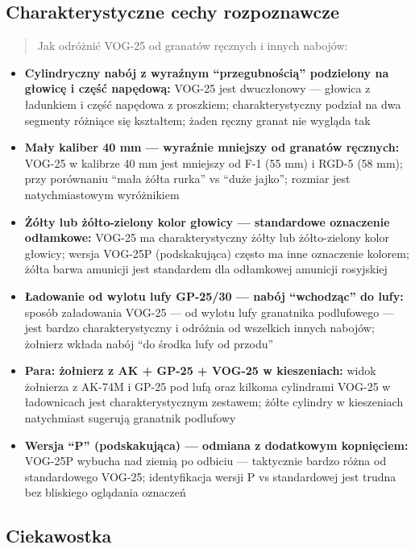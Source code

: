 \documentclass[12pt,oneside]{book}
\providecommand{\tightlist}{%
  \setlength{\itemsep}{0pt}\setlength{\parskip}{0pt}}
\begin{document}
\subsection{Charakterystyczne cechy
rozpoznawcze}\label{charakterystyczne-cechy-rozpoznawcze-121}

\begin{quote}
Jak odróżnić VOG-25 od granatów ręcznych i innych nabojów:
\end{quote}

\begin{itemize}
\tightlist
\item
  \textbf{Cylindryczny nabój z wyraźnym ``przegubnością'' podzielony na
  głowicę i część napędową:} VOG-25 jest dwuczłonowy --- głowica z
  ładunkiem i część napędowa z proszkiem; charakterystyczny podział na
  dwa segmenty różniące się kształtem; żaden ręczny granat nie wygląda
  tak
\item
  \textbf{Mały kaliber 40 mm --- wyraźnie mniejszy od granatów
  ręcznych:} VOG-25 w kalibrze 40 mm jest mniejszy od F-1 (55 mm) i
  RGD-5 (58 mm); przy porównaniu ``mała żółta rurka'' vs ``duże jajko'';
  rozmiar jest natychmiastowym wyróżnikiem
\item
  \textbf{Żółty lub żółto-zielony kolor głowicy --- standardowe
  oznaczenie odłamkowe:} VOG-25 ma charakterystyczny żółty lub
  żółto-zielony kolor głowicy; wersja VOG-25P (podskakująca) często ma
  inne oznaczenie kolorem; żółta barwa amunicji jest standardem dla
  odłamkowej amunicji rosyjskiej
\item
  \textbf{Ładowanie od wylotu lufy GP-25/30 --- nabój ``wchodząc'' do
  lufy:} sposób załadowania VOG-25 --- od wylotu lufy granatnika
  podlufowego --- jest bardzo charakterystyczny i odróżnia od wszelkich
  innych nabojów; żołnierz wkłada nabój ``do środka lufy od przodu''
\item
  \textbf{Para: żołnierz z AK + GP-25 + VOG-25 w kieszeniach:} widok
  żołnierza z AK-74M i GP-25 pod lufą oraz kilkoma cylindrami VOG-25 w
  ładownicach jest charakterystycznym zestawem; żółte cylindry w
  kieszeniach natychmiast sugerują granatnik podlufowy
\item
  \textbf{Wersja ``P'' (podskakująca) --- odmiana z dodatkowym
  kopnięciem:} VOG-25P wybucha nad ziemią po odbiciu --- taktycznie
  bardzo różna od standardowego VOG-25; identyfikacja wersji P vs
  standardowej jest trudna bez bliskiego oglądania oznaczeń
\end{itemize}

\subsection{Ciekawostka}\label{ciekawostka-121}
\end{document}
